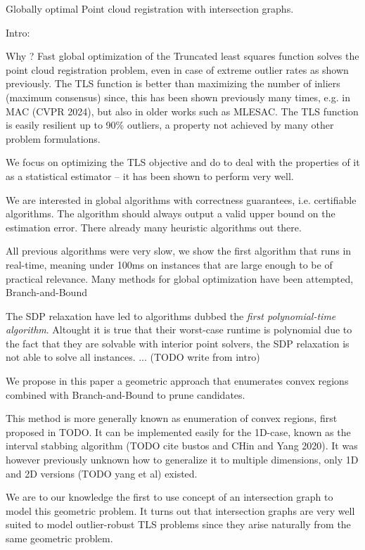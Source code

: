 Globally optimal Point cloud registration with intersection graphs. 

Intro: 

Why ? Fast global optimization of the Truncated least squares function solves the point cloud registration problem, even in case of extreme outlier rates as shown previously. The TLS function is better than maximizing the number of inliers (maximum consensus) since, this has been shown previously many times, e.g. in MAC (CVPR 2024), but also in older works such as MLESAC. The TLS function is easily resilient up to 90\% outliers, a property not achieved by many other problem formulations. 

We focus on optimizing the TLS objective and do to deal with the properties of it as a statistical estimator -- it has been shown to perform very well. 

We are interested in global algorithms with correctness guarantees, i.e. certifiable algorithms. The algorithm should always output a valid upper bound on the estimation error. There already many heuristic algorithms out there.

All previous algorithms were very slow, we show the first algorithm that runs in real-time, meaning under 100ms on instances that are large enough to be of practical relevance. 
Many methods for global optimization have been  attempted, Branch-and-Bound 

The SDP relaxation have led to algorithms dubbed the \textit{first polynomial-time algorithm}. Altought it is true that their worst-case runtime is polynomial due to the fact that they are solvable with interior point solvers, the SDP relaxation is not able to solve all instances. ... (TODO write from intro)

We propose in this paper a geometric approach that enumerates 
convex regions combined with Branch-and-Bound to prune candidates.

This method is more generally known as enumeration of convex regions, first proposed in TODO. It can be implemented easily for the 1D-case, known as the interval stabbing algorithm (TODO cite bustos and CHin and Yang 2020). It was however previously unknown how to generalize it to multiple dimensions, only 1D and 2D versions (TODO yang et al) existed. 

We are to our knowledge the first to use concept of an intersection graph to model this geometric problem. It turns out that intersection graphs are very well suited to model outlier-robust TLS problems since they arise naturally from the same geometric problem. 

